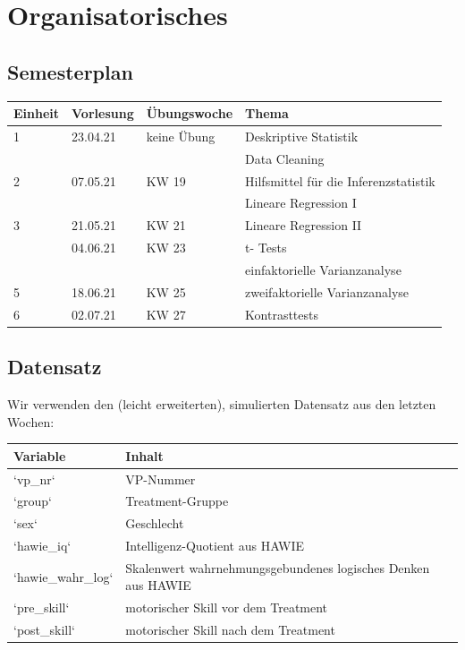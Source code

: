 \documentclass[
]{book}
\begin{document}
\hypertarget{organisatorisches-3}{%
\section{Organisatorisches}\label{organisatorisches-3}}

\hypertarget{semesterplan-4}{%
\subsection{Semesterplan}\label{semesterplan-4}}

\begin{tabular}[t]{llll}
\toprule
Einheit & Vorlesung & Übungswoche & Thema\\
\midrule
1 & 23.04.21 & keine Übung & Deskriptive Statistik\\
 &  &  & Data Cleaning\\
2 & 07.05.21 & KW 19 & Hilfsmittel für die Inferenzstatistik\\
 &  &  & Lineare Regression I\\
3 & 21.05.21 & KW 21 & Lineare Regression II\\
\addlinespace
4 & 04.06.21 & KW 23 & t- Tests\\
 &  &  & einfaktorielle Varianzanalyse\\
5 & 18.06.21 & KW 25 & zweifaktorielle Varianzanalyse\\
6 & 02.07.21 & KW 27 & Kontrasttests\\
\bottomrule
\end{tabular}

\hypertarget{datensatz-2}{%
\subsection{Datensatz}\label{datensatz-2}}

Wir verwenden den (leicht erweiterten), simulierten Datensatz aus den letzten Wochen:

\begin{tabular}[t]{ll}
\toprule
Variable & Inhalt\\
\midrule
`vp\_nr` & VP-Nummer\\
`group` & Treatment-Gruppe\\
`sex` & Geschlecht\\
`hawie\_iq` & Intelligenz-Quotient aus HAWIE\\
`hawie\_wahr\_log` & Skalenwert wahrnehmungsgebundenes 
 logisches Denken aus HAWIE\\
\addlinespace
`pre\_skill` & motorischer Skill vor dem Treatment\\
`post\_skill` & motorischer Skill nach dem Treatment\\
\bottomrule
\end{tabular}
\end{document}
